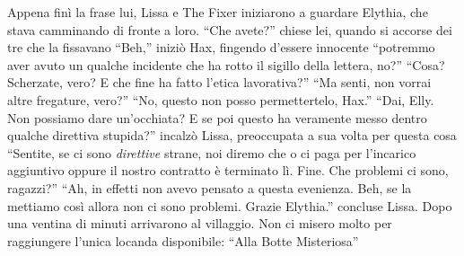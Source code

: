     Appena finì la frase lui, Lissa e The Fixer iniziarono a guardare
    Elythia, che stava camminando di fronte a loro. ``Che avete?'' chiese
    lei, quando si accorse dei tre che la fissavano ``Beh,'' iniziò Hax,
    fingendo d'essere innocente ``potremmo aver avuto un qualche incidente
    che ha rotto il sigillo della lettera, no?'' ``Cosa? Scherzate, vero? E
    che fine ha fatto l'etica lavorativa?'' ``Ma senti, non vorrai altre
    fregature, vero?'' ``No, questo non posso permettertelo, Hax.'' ``Dai,
    Elly. Non possiamo dare un'occhiata? E se poi questo ha veramente messo
    dentro qualche direttiva stupida?'' incalzò Lissa, preoccupata a sua
    volta per questa cosa ``Sentite, se ci sono \emph{direttive} strane,
    noi diremo che o ci paga per l'incarico aggiuntivo oppure il nostro
    contratto è terminato lì. Fine. Che problemi ci sono, ragazzi?'' ``Ah,
    in effetti non avevo pensato a questa evenienza. Beh, se la mettiamo
    così allora non ci sono problemi. Grazie Elythia.'' concluse Lissa.
    Dopo una ventina di minuti arrivarono al villaggio. Non ci misero molto
    per raggiungere l'unica locanda disponibile: ``Alla Botte Misteriosa''

